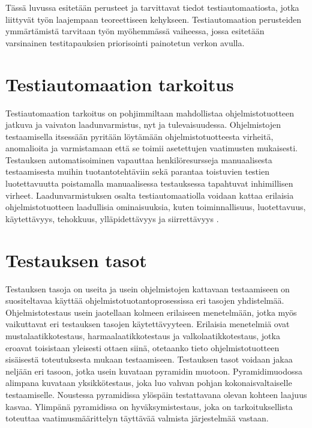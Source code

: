 Tässä luvussa esitetään perusteet ja tarvittavat tiedot testiautomaatiosta, jotka liittyvät työn laajempaan teoreettiseen kehykseen.
Testiautomaation perusteiden ymmärtämistä tarvitaan työn myöhemmässä vaiheessa, jossa esitetään varsinainen testitapauksien priorisointi painotetun verkon avulla.

\section{Testiautomaation tarkoitus} \label{07_testiautomaation_tarkoitus}

Testiautomaation tarkoitus on pohjimmiltaan mahdollistaa ohjelmistotuotteen jatkuva ja vaivaton laadunvarmistus, nyt ja tulevaisuudessa.
Ohjelmistojen testaamisella itsessään pyritään löytämään ohjelmistotuotteesta virheitä, anomalioita ja varmistamaan että se toimii asetettujen vaatimusten mukaisesti.
Testauksen automatisoiminen vapauttaa henkilöresursseja manuaalisesta testaamisesta muihin tuotantotehtäviin sekä parantaa toistuvien testien luotettavuutta poistamalla manuaalisessa testauksessa tapahtuvat inhimillisen virheet.
Laadunvarmistuksen osalta testiautomaatiolla voidaan kattaa erilaisia ohjelmistotuotteen laadullisia ominaisuuksia, kuten toiminnallisuus, luotettavuus, käytettävyys, tehokkuus, ylläpidettävyys ja siirrettävyys \parencite{iso_9126-1_2001}.

\section{Testauksen tasot} \label{07_testauksen_tasot}

Testauksen tasoja on useita ja usein ohjelmistojen kattavaan testaamiseen on suositeltavaa käyttää ohjelmistotuotantoprosessissa eri tasojen yhdistelmää.
Ohjelmistotestaus usein jaotellaan kolmeen erilaiseen menetelmään, jotka myös vaikuttavat eri testauksen tasojen käytettävyyteen.
Erilaisia menetelmiä ovat mustalaatikkotestaus, harmaalaatikkotestaus ja valkolaatikkotestaus, jotka eroavat toisistaan yleisesti ottaen siinä, otetaanko tieto ohjelmistotuotteen sisäisestä toteutuksesta mukaan testaamiseen.
Testauksen tasot voidaan jakaa neljään eri tasoon, jotka usein kuvataan pyramidin muotoon.
Pyramidimuodossa alimpana kuvataan yksikkötestaus, joka luo vahvan pohjan kokonaisvaltaiselle testaamiselle.
Noustessa pyramidissa ylöspäin testattavana olevan kohteen laajuus kasvaa.
Ylimpänä pyramidissa on hyväksymistestaus, joka on tarkoituksellista toteuttaa vaatimusmäärittelyn täyttävää valmista järjestelmää vastaan.

